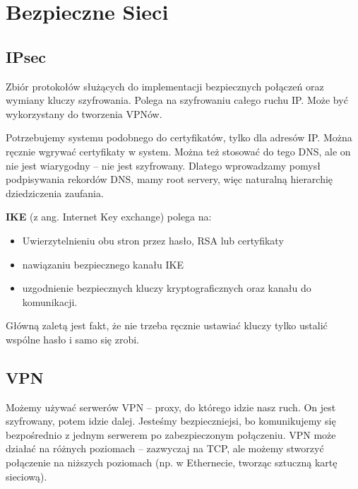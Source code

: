 \section{Bezpieczne Sieci}
\subsection{IPsec}
Zbiór protokołów służących do implementacji bezpiecznych połączeń oraz wymiany kluczy szyfrowania. Polega na szyfrowaniu całego ruchu IP. Może być wykorzystany do tworzenia VPNów.

Potrzebujemy systemu podobnego do certyfikatów, tylko dla adresów IP. Można ręcznie wgrywać certyfikaty w system. Można też stosować do tego DNS, ale on nie jest wiarygodny -- nie jest szyfrowany. Dlatego wprowadzamy pomysł podpisywania rekordów DNS, mamy root servery, więc naturalną hierarchię dziedziczenia zaufania.

\textbf{IKE} (z ang. Internet Key exchange) polega na:
\begin{itemize}
	\item Uwierzytelnieniu obu stron przez hasło, RSA lub certyfikaty
	\item nawiązaniu bezpiecznego kanału IKE
	\item uzgodnienie bezpiecznych kluczy kryptograficznych oraz kanału do komunikacji.
\end{itemize}
Główną zaletą jest fakt, że nie trzeba ręcznie ustawiać kluczy tylko ustalić wspólne hasło i samo się zrobi.

\subsection{VPN}
Możemy używać serwerów VPN -- proxy, do którego idzie nasz ruch. On jest szyfrowany, potem idzie dalej. Jesteśmy bezpieczniejsi, bo komunikujemy się bezpośrednio z jednym serwerem po zabezpieczonym połączeniu. VPN może działać na różnych poziomach -- zazwyczaj na TCP, ale możemy stworzyć połączenie na niższych poziomach (np. w Ethernecie, tworząc sztuczną kartę sieciową).
